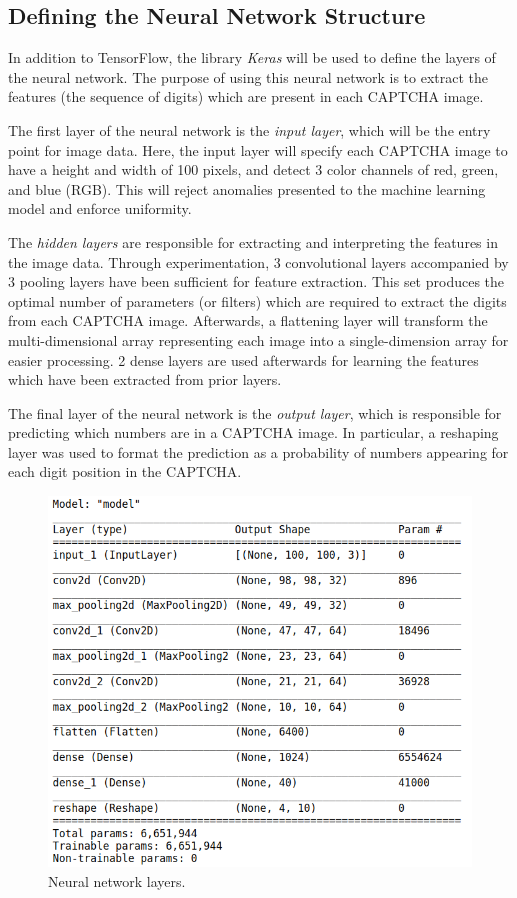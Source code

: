 \documentclass[11pt,conference]{IEEEtran}
\begin{document}
\subsection{Defining the Neural Network Structure}
In addition to TensorFlow, the library \emph{Keras} will be used to define the
layers of the neural network. The purpose of using this neural network is to extract the features
(the sequence of digits) which are present in each CAPTCHA image.

The first layer of the neural network is the \emph{input layer}, which will be
the entry point for image data. Here, the input layer will specify each CAPTCHA image
to have a height and width of 100 pixels, and detect 3 color channels of
red, green, and blue (RGB). This will reject anomalies presented to the machine
learning model and enforce uniformity.

The \emph{hidden layers} are responsible for extracting and interpreting the
features in the image data. Through experimentation, 3
convolutional layers accompanied by 3 pooling layers have been sufficient 
for feature extraction. This set produces the optimal number of parameters (or
filters) which are required to extract the digits from each CAPTCHA image.
Afterwards, a flattening layer will transform the multi-dimensional array
representing each image into a single-dimension array for
easier processing. 2 dense layers are used afterwards for learning the features
which have been extracted from prior layers. 

The final layer of the neural network is the \emph{output layer}, which is
responsible for predicting which numbers are in a CAPTCHA image. In
particular, a reshaping layer was used to format the prediction as a
probability of numbers appearing for each digit position in the CAPTCHA.

\begin{figure}[htbp]
	\centerline{\includegraphics[scale=0.28]{images/model-summary.png}}
	\caption{Neural network layers.}
	\label{figure}
\end{figure}
\end{document}
